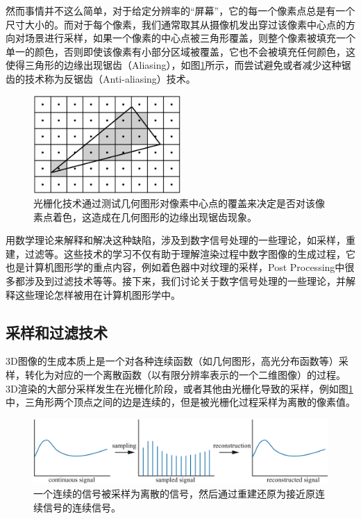 \documentclass[10pt,fancyhdr,graybox, envcountchap,oribibl,twoside]{svmono}
\begin{document}
然而事情并不这么简单，对于给定分辨率的“屏幕”，它的每一个像素点总是有一个尺寸大小的。而对于每个像素，我们通常取其从摄像机发出穿过该像素中心点的方向对场景进行采样，如果一个像素的中心点被三角形覆盖，则整个像素被填充一个单一的颜色，否则即使该像素有小部分区域被覆盖，它也不会被填充任何颜色，这使得三角形的边缘出现锯齿（Aliasing），如图\ref{f:intro-aliasing-triangle}所示，而尝试避免或者减少这种锯齿的技术称为反锯齿（Anti-aliasing）技术。

\begin{figure}
\sidecaption
	\includegraphics[width=0.5\textwidth]{figures/intro/aliasing-triangle}
	\caption{光栅化技术通过测试几何图形对像素中心点的覆盖来决定是否对该像素点着色，这造成在几何图形的边缘出现锯齿现象。}
	\label{f:intro-aliasing-triangle}
\end{figure}

用数学理论来解释和解决这种缺陷，涉及到数字信号处理的一些理论，如采样，重建，过滤等。这些技术的学习不仅有助于理解渲染过程中数字图像的生成过程，它也是计算机图形学的重点内容，例如着色器中对纹理的采样，Post Processing中很多都涉及到过滤技术等等。接下来，我们讨论关于数字信号处理的一些理论，并解释这些理论怎样被用在计算机图形学中。





\subsection{采样和过滤技术}
3D图像的生成本质上是一个对各种连续函数（如几何图形，高光分布函数等）采样，转化为对应的一个离散函数（以有限分辨率表示的一个二维图像）的过程。3D渲染的大部分采样发生在光栅化阶段，或者其他由光栅化导致的采样，例如图\ref{f:intro-aliasing-triangle}中，三角形两个顶点之间的边是连续的，但是被光栅化过程采样为离散的像素值。

\begin{figure}
	\includegraphics[width=1.0\textwidth]{figures/intro/signal-processing}
	\caption{一个连续的信号被采样为离散的信号，然后通过重建还原为接近原连续信号的连续信号。}
	\label{f:intro-signal-processing}
\end{figure}
\end{document}
